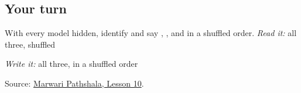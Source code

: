 \subsection*{Your turn}
With every model hidden, identify and say \textbf{}, \textbf{}, and \textbf{} in a shuffled order. \emph{Read it:} all three, shuffled

\emph{Write it:} all three, in a shuffled order

\begin{tcolorbox}[breakable,colback=teal!4,colframe=teal!35!black,title={Before you move on}]
Source: \href{https://www.marwaripathshala.com/marwari-lesson-10-english}{Marwari Pathshala, Lesson 10}.
\end{tcolorbox}
